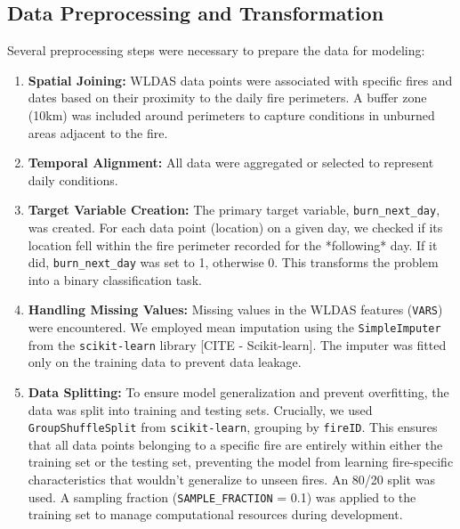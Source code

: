 \documentclass[conference]{IEEEtran}
\begin{document}
\subsection{Data Preprocessing and Transformation}
Several preprocessing steps were necessary to prepare the data for modeling:
\begin{enumerate}
    \item \textbf{Spatial Joining:} WLDAS data points were associated with specific fires and dates based on their proximity to the daily fire perimeters. A buffer zone (10km) was included around perimeters to capture conditions in unburned areas adjacent to the fire.
    \item \textbf{Temporal Alignment:} All data were aggregated or selected to represent daily conditions.
    \item \textbf{Target Variable Creation:} The primary target variable, \texttt{burn\_next\_day}, was created. For each data point (location) on a given day, we checked if its location fell within the fire perimeter recorded for the *following* day. If it did, \texttt{burn\_next\_day} was set to 1, otherwise 0. This transforms the problem into a binary classification task.
    \item \textbf{Handling Missing Values:} Missing values in the WLDAS features (\texttt{VARS}) were encountered. We employed mean imputation using the \texttt{SimpleImputer} from the \texttt{scikit-learn} library [CITE - Scikit-learn]. The imputer was fitted only on the training data to prevent data leakage.
    \item \textbf{Data Splitting:} To ensure model generalization and prevent overfitting, the data was split into training and testing sets. Crucially, we used \texttt{GroupShuffleSplit} from \texttt{scikit-learn}, grouping by \texttt{fireID}. This ensures that all data points belonging to a specific fire are entirely within either the training set or the testing set, preventing the model from learning fire-specific characteristics that wouldn't generalize to unseen fires. An 80/20 split was used. A sampling fraction (\texttt{SAMPLE\_FRACTION} = 0.1) was applied to the training set to manage computational resources during development.
\end{enumerate}
\end{document}
